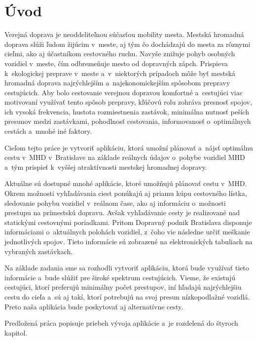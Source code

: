 \chapter*{Úvod} %

Verejná doprava je neoddeliteľnou súčasťou mobility mesta. Mestská hromadná doprava slúži ľudom žijúcim v~meste, aj tým čo dochádzajú do mesta za rôznymi cieľmi, ako aj účastníkom cestovného ruchu. Navyše znižuje pohyb osobných vozidiel v~meste, čím odbremeňuje mesto od dopravných zápch. Prispieva k~ekologickej preprave v~meste a~v~niektorých prípadoch môže byť mestská hromadná doprava najrýchlejším a~najekonomickejším spôsobom prepravy cestujúcich. Aby bolo cestovanie verejnou dopravou komfortné a~cestujúci viac motivovaní využívať tento spôsob prepravy, kľúčovú rolu zohráva presnosť spojov, ich vysoká frekvencia, hustota rozmiestnenia zastávok, minimálna nutnosť peších presunov medzi zastávkami, pohodlnosť cestovania, informovanosť o~optimálnych cestách a~mnohé iné faktory.

Cieľom tejto práce je vytvoriť aplikáciu, ktorá umožní plánovať a~nájsť optimálnu cestu v~MHD v~Bratislave na základe reálnych údajov o~pohybe vozidiel MHD a~tým prispieť k~vyššej atraktívnosti mestskej hromadnej dopravy. 

Aktuálne sú dostupné mnohé aplikácie, ktoré umožňujú plánovať cestu v~MHD. Okrem možnosti vyhľadávania ciest ponúkajú aj priamu kúpu cestovného lístka, sledovanie pohybu vozidiel v~reálnom čase, ako aj informáciu o~možnosti prestupu na prímestskú dopravu. Avšak vyhľadávanie cesty je realizované nad statickými cestovnými poriadkami. Pritom Dopravný podnik Bratislava disponuje informáciami o~aktuálnych polohách vozidiel, z~čoho vie následne určiť meškanie jednotlivých spojov. Tieto informácie sú zobrazené na elektronických tabuliach na vybraných zastávkach.

Na základe zadania sme sa rozhodli vytvoriť aplikáciu, ktorá bude využívať tieto informácie a~bude slúžiť pre široké spektrum cestujúcich. Vieme, že existujú cestujúci, ktorí preferujú minimálny počet prestupov, iní hľadajú najrýchlejšiu cestu do cieľa a~sú aj takí, ktorí potrebujú na svoj presun nízkopodlažné vozidlá. Preto naša aplikácia bude poskytovať aj alternatívne cesty.

Predložená práca popisuje priebeh vývoja aplikácie a~je rozdelená do štyroch kapitol. 

